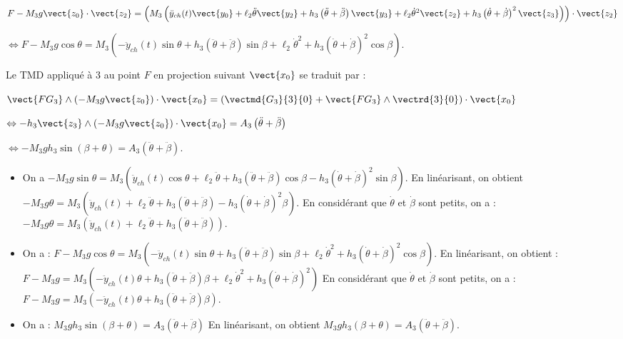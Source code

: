 \begin{multicols}{2}
\begin{corrige}
$F-M_3 g \vect{z_0}\cdot \vect{z_2} = 
\left( M_3\left(\ddot{y}_{ch}(t) \vect{y_0}+\ell_2\ddot{\theta} \vect{y_2}+h_3\left(\ddot{\theta}+\ddot{\beta}\right) \vect{y_3}
+   
\ell_2\dot{\theta}^2 \vect{z_2}  +h_3\left(\dot{\theta}+\dot{\beta}\right)^2\vect{z_3}\right)\right) \cdot \vect{z_2}$

$\Leftrightarrow F-M_3 g \cos \theta  = 
 M_3\left(- \ddot{y}_{ch}(t) \sin \theta +h_3\left(\ddot{\theta}+\ddot{\beta}\right) \sin\beta
+   
\ell_2\dot{\theta}^2   +h_3\left(\dot{\theta}+\dot{\beta}\right)^2\cos \beta \right) $.



Le TMD appliqué à 3 au point $F$ en projection suivant $\vect{x_0}$ se traduit par : 

$\vect{FG_3}\wedge \left(-M_3g \vect{z_0} \right) \cdot \vect{x_0} =\left(\vectmd{G_3}{3}{0}+\vect{FG_3}\wedge \vectrd{3}{0}\right)\cdot \vect{x_0}$

$\Leftrightarrow -h_3 \vect{z_3} \wedge \left(-M_3g \vect{z_0} \right) \cdot \vect{x_0} =A_3 \left(\ddot{\theta}+\ddot{\beta} \right)$

$\Leftrightarrow - M_3gh_3 \sin\left( \beta + \theta\right) =A_3 \left(\ddot{\theta}+\ddot{\beta} \right)$.
\end{corrige}
\else
\fi


\ifprof
\begin{corrige}
\begin{itemize}
\item On a 
$ -M_3 g \sin \theta  = 
 M_3\left(\ddot{y}_{ch}(t) \cos \theta +\ell_2\ddot{\theta} +h_3\left(\ddot{\theta}+\ddot{\beta}\right)\cos \beta 
-h_3\left(\dot{\theta}+\dot{\beta}\right)^2\sin\beta \right)$. En linéarisant, on obtient 
$ -M_3 g \theta  = 
 M_3\left(\ddot{y}_{ch}(t) +\ell_2\ddot{\theta} +h_3\left(\ddot{\theta}+\ddot{\beta}\right) 
-h_3\left(\dot{\theta}+\dot{\beta}\right)^2\beta \right)$. En considérant que $\dot{\theta}$ et $\dot{\beta}$ sont petits, on a : 
$ -M_3 g \theta  = 
 M_3\left(\ddot{y}_{ch}(t) +\ell_2\ddot{\theta} +h_3\left(\ddot{\theta}+\ddot{\beta}\right)  \right)$.
\item  On a : $F-M_3 g \cos \theta  = 
 M_3\left(- \ddot{y}_{ch}(t) \sin \theta +h_3\left(\ddot{\theta}+\ddot{\beta}\right) \sin\beta
+   
\ell_2\dot{\theta}^2   +h_3\left(\dot{\theta}+\dot{\beta}\right)^2\cos \beta \right) $. En linéarisant, on obtient :
$F-M_3 g  = 
 M_3\left(- \ddot{y}_{ch}(t) \theta +h_3\left(\ddot{\theta}+\ddot{\beta}\right) \beta
+   
\ell_2\dot{\theta}^2   +h_3\left(\dot{\theta}+\dot{\beta}\right)^2 \right) $
En considérant que $\dot{\theta}$ et $\dot{\beta}$ sont petits, on a : 
$F-M_3 g  = 
 M_3\left(- \ddot{y}_{ch}(t) \theta +h_3\left(\ddot{\theta}+\ddot{\beta}\right) \beta
 \right) $.
 \item On a : $ M_3gh_3 \sin\left( \beta + \theta\right) =A_3 \left(\ddot{\theta}+\ddot{\beta} \right)$ En linéarisant, on obtient  $M_3gh_3 \left( \beta + \theta\right) =A_3 \left(\ddot{\theta}+\ddot{\beta} \right)$.
 \end{itemize}


\end{corrige}
\end{multicols}
